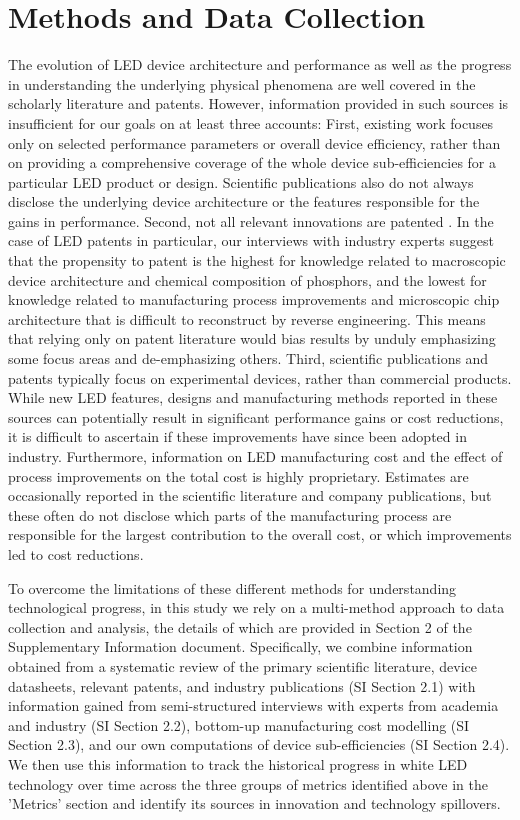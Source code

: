 \documentclass[parskip=full]{article}
\begin{document}
\section{Methods and Data Collection}
\label{sec:methods}

The evolution of LED device architecture and performance as well as the progress in understanding the underlying physical phenomena are well covered in the scholarly literature and patents. However, information provided in such sources is insufficient for our goals on at least three accounts: First, existing work focuses only on selected performance parameters or overall device efficiency, rather than on providing a comprehensive coverage of the whole device sub-efficiencies for a particular LED product or design. Scientific publications also do not always disclose the underlying device architecture or the features responsible for the gains in performance. Second, not all relevant innovations are patented \cite{Pakes_1980,Fontana_2013}. In the case of LED patents in particular, our interviews with industry experts suggest that the propensity to patent is the highest for knowledge related to macroscopic device architecture and chemical composition of phosphors, and the lowest for knowledge related to manufacturing process improvements and microscopic chip architecture that is difficult to reconstruct by reverse engineering. This means that relying only on patent literature would bias results by unduly emphasizing some focus areas and de-emphasizing others. Third, scientific publications and patents typically focus on experimental devices, rather than commercial products. While new LED features, designs and manufacturing methods reported in these sources can potentially result in significant performance gains or cost reductions, it is difficult to ascertain if these improvements have since been adopted in industry.  Furthermore, information on LED manufacturing cost and the effect of process improvements on the total cost is highly proprietary. Estimates are occasionally reported in the scientific literature and company publications, but these often do not disclose which parts of the manufacturing process are responsible for the largest contribution to the overall cost, or which improvements led to cost reductions.

To overcome the limitations of these different methods for understanding technological progress, in this study we rely on a multi-method approach to data collection and analysis, the details of which are provided in Section 2 of the Supplementary Information document. Specifically, we combine information obtained from a systematic review of the primary scientific literature, device datasheets, relevant patents, and industry publications (SI Section 2.1) with information gained from semi-structured interviews with experts from academia and industry (SI Section 2.2), bottom-up manufacturing cost modelling (SI Section 2.3), and our own computations of device sub-efficiencies (SI Section 2.4). We then use this information to track the historical progress in white LED technology over time across the three groups of metrics identified above in the 'Metrics' section and identify its sources in innovation and technology spillovers.
\end{document}
